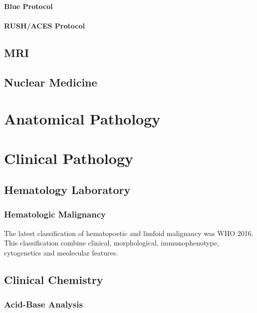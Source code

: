 \documentclass[
  letterpaper,
  DIV=11,
  numbers=noendperiod]{scrreprt}
\begin{document}
\subsubsection{Blue Protocol}\label{blue-protocol}

\subsubsection{RUSH/ACES Protocol}\label{rushaces-protocol}

\section{MRI}\label{mri}

\section{Nuclear Medicine}\label{nuclear-medicine}

\chapter{Anatomical Pathology}\label{anatomical-pathology}

\chapter{Clinical Pathology}\label{clinical-pathology}

\section{Hematology Laboratory}\label{hematology-laboratory}

\subsection{Hematologic Malignancy}\label{hematologic-malignancy}

The latest classification of hematopoetic and limfoid malignancy was WHO
2016. This classification combine clinical, morphological,
immunophenotype, cytogenetics and meolecular features.

\section{Clinical Chemistry}\label{clinical-chemistry}

\subsection{Acid-Base Analysis}\label{acid-base-analysis}
\end{document}
